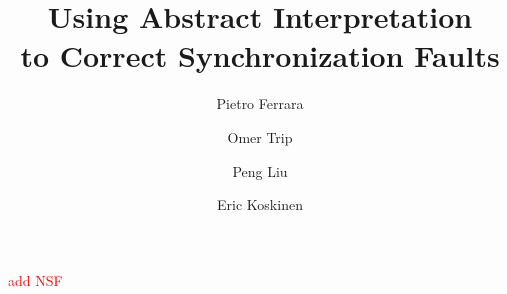 \documentclass{llncs}
\begin{document}
\title{Using Abstract Interpretation\\
  to Correct Synchronization Faults}



\author{
  Pietro Ferrara 
  \and Omer Trip 
  \and Peng Liu 
  \and Eric Koskinen 
}
\maketitle

\newcommand\ignore[1]{}
\newcommand{\pengtodo}[1]{{\bf #1}}
\newcommand{\pietrotodo}[1]{{\bf #1}}

\begin{abstract}
  
\end{abstract}

\textcolor{red}{add NSF}







\vfill
\pagebreak
{%

%

}


\vfill
\newpage
\appendix

\end{document}
